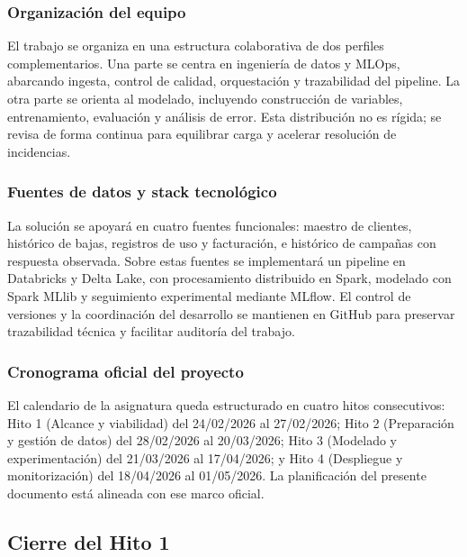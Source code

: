 \documentclass[12pt,a4paper]{article}
\begin{document}
\subsubsection{Organización del equipo}

El trabajo se organiza en una estructura colaborativa de dos perfiles complementarios. Una parte se centra en ingeniería de datos y MLOps, abarcando ingesta, control de calidad, orquestación y trazabilidad del pipeline. La otra parte se orienta al modelado, incluyendo construcción de variables, entrenamiento, evaluación y análisis de error. Esta distribución no es rígida; se revisa de forma continua para equilibrar carga y acelerar resolución de incidencias.\par

\subsubsection{Fuentes de datos y stack tecnológico}

La solución se apoyará en cuatro fuentes funcionales: maestro de clientes, histórico de bajas, registros de uso y facturación, e histórico de campañas con respuesta observada. Sobre estas fuentes se implementará un pipeline en Databricks y Delta Lake, con procesamiento distribuido en Spark, modelado con Spark MLlib y seguimiento experimental mediante MLflow. El control de versiones y la coordinación del desarrollo se mantienen en GitHub para preservar trazabilidad técnica y facilitar auditoría del trabajo.\par

\subsubsection{Cronograma oficial del proyecto}

El calendario de la asignatura queda estructurado en cuatro hitos consecutivos: Hito 1 (Alcance y viabilidad) del 24/02/2026 al 27/02/2026; Hito 2 (Preparación y gestión de datos) del 28/02/2026 al 20/03/2026; Hito 3 (Modelado y experimentación) del 21/03/2026 al 17/04/2026; y Hito 4 (Despliegue y monitorización) del 18/04/2026 al 01/05/2026. La planificación del presente documento está alineada con ese marco oficial.\par

\subsection{Cierre del Hito 1}
\end{document}
